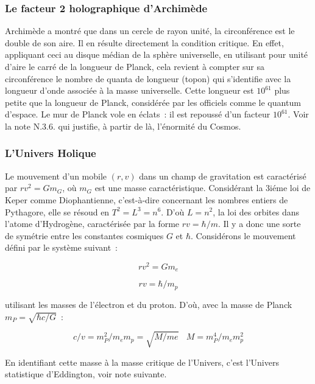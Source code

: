 \documentclass[a4paper,12pt]{article}
\begin{document}
\subsubsection{Le facteur 2 holographique d'Archimède}

Archimède a montré que dans un cercle de rayon unité, la circonférence est le double de son aire. Il en résulte directement la condition critique. En effet, appliquant ceci au disque médian de la sphère universelle, en utilisant pour unité d’aire le carré de la longueur de Planck, cela revient à compter sur sa circonférence le nombre de quanta de longueur (topon) qui s’identifie avec la longueur d’onde associée à la masse universelle. Cette longueur est $10^{61}$ plus petite que la longueur de Planck, considérée par les officiels comme le quantum d’espace. Le mur de Planck vole en éclats : il est repoussé d’un facteur $10^{61}$. Voir la note N.3.6. qui justifie, à partir de là, l’énormité du Cosmos. 



\subsubsection{L'Univers Holique}

 Le mouvement d'un mobile $(r,v)$ dans un champ de gravitation est caractérisé par $rv^2 = Gm_G$, où $m_G$ est une masse caractéristique. Considérant la 3iéme loi de Keper comme Diophantienne, c’est-à-dire concernant les nombres entiers de Pythagore, elle se résoud en $T^2 = L^3 = n^6$. D'où $L = n^2$, la loi des orbites dans l'atome d'Hydrogène, caractérisée par la forme $rv = \hbar/m$. Il y a donc une sorte de symétrie entre les constantes cosmiques $G$ et $\hbar$. Considérons le mouvement défini par le système suivant :
 
\begin{equation}
r v^2 = Gm_e
\end{equation}

\begin{equation}
r v = \hbar/m_p
\end{equation}

utilisant les masses de l'électron et du proton. D'où, avec la masse de Planck $m_P = \sqrt{\hbar c/G}$ :

\begin{equation}
c/v = m_P^2/m_em_p = \sqrt{M/me}                 ~~~~           M = m_P^4/m_em_p^2
\end{equation}

En identifiant cette masse à la masse critique de l'Univers, c'est  l'Univers statistique d'Eddington, voir note suivante.
\end{document}
